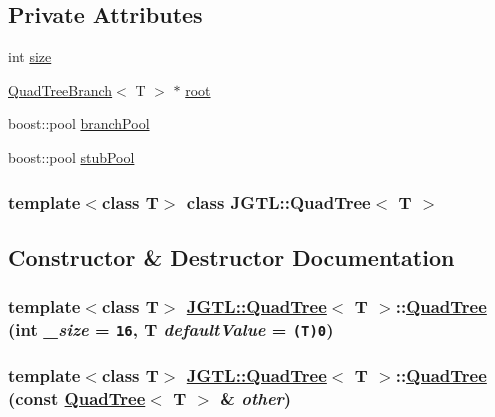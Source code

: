 \subsection*{Private Attributes}
\begin{CompactItemize}
\item 
int \hyperlink{class_j_g_t_l_1_1_quad_tree_2e563e76183a1561d6113521465bab13}{size}
\item 
\hyperlink{class_j_g_t_l_1_1_quad_tree_branch}{Quad\-Tree\-Branch}$<$ T $>$ $\ast$ \hyperlink{class_j_g_t_l_1_1_quad_tree_e93f0860bc8a5fca178cbdc3bc8214d8}{root}
\item 
boost::pool \hyperlink{class_j_g_t_l_1_1_quad_tree_47cf98740d4640c0fbc23780aa377ff5}{branch\-Pool}
\item 
boost::pool \hyperlink{class_j_g_t_l_1_1_quad_tree_5e72fbf6f44222a8a1aa51abb91715e8}{stub\-Pool}
\end{CompactItemize}
\subsubsection*{template$<$class T$>$ class JGTL::Quad\-Tree$<$ T $>$}



\subsection{Constructor \& Destructor Documentation}
\hypertarget{class_j_g_t_l_1_1_quad_tree_c256396553c64aa8de31ca662f50aa66}{
\subsubsection[QuadTree]{\setlength{\rightskip}{0pt plus 5cm}template$<$class T$>$ \hyperlink{class_j_g_t_l_1_1_quad_tree}{JGTL::Quad\-Tree}$<$ T $>$::\hyperlink{class_j_g_t_l_1_1_quad_tree}{Quad\-Tree} (int {\em \_\-size} = {\tt 16}, T {\em default\-Value} = {\tt (T)0})}}
\label{class_j_g_t_l_1_1_quad_tree_c256396553c64aa8de31ca662f50aa66}


\hypertarget{class_j_g_t_l_1_1_quad_tree_fbc1b07fcbfd69920d2502b6db795dad}{
\subsubsection[QuadTree]{\setlength{\rightskip}{0pt plus 5cm}template$<$class T$>$ \hyperlink{class_j_g_t_l_1_1_quad_tree}{JGTL::Quad\-Tree}$<$ T $>$::\hyperlink{class_j_g_t_l_1_1_quad_tree}{Quad\-Tree} (const \hyperlink{class_j_g_t_l_1_1_quad_tree}{Quad\-Tree}$<$ T $>$ \& {\em other})}}
\label{class_j_g_t_l_1_1_quad_tree_fbc1b07fcbfd69920d2502b6db795dad}


